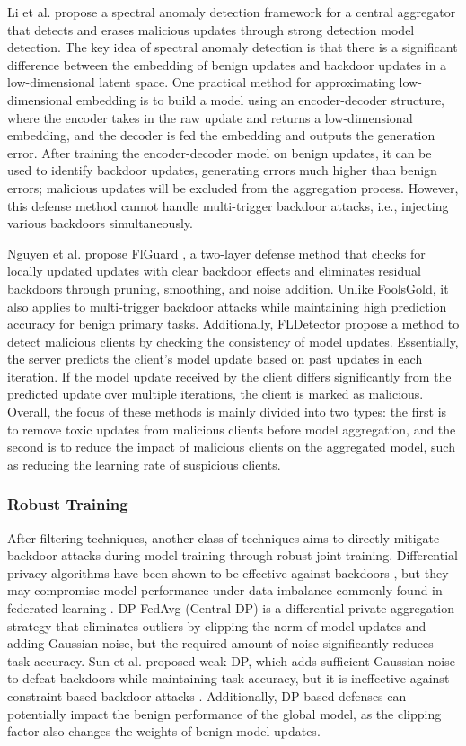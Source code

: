 \documentclass[conference]{IEEEtran}
\begin{document}
Li et al. \cite{b79} propose a spectral anomaly detection framework for a
central aggregator that detects and erases malicious updates through strong detection model detection.
The key idea of spectral anomaly detection is that there is a significant difference between the embedding
of benign updates and backdoor updates in a low-dimensional latent space. One practical method for approximating
low-dimensional embedding is to build a model using an encoder-decoder structure, where the encoder takes
in the raw update and returns a low-dimensional embedding, and the decoder is fed the embedding and outputs
the generation error.  After training the encoder-decoder model on benign updates, it can be used to identify
backdoor updates, generating errors much higher than benign errors; malicious updates will be excluded from
the aggregation process. However, this defense method cannot handle multi-trigger backdoor attacks, i.e.,
injecting various backdoors simultaneously.

Nguyen et al. propose FlGuard \cite{b80}, a two-layer defense method that checks
for locally updated updates with clear backdoor effects and eliminates residual backdoors through pruning, smoothing, and noise
addition. Unlike FoolsGold\cite{b78}, it also applies to multi-trigger backdoor attacks while maintaining high prediction accuracy for benign primary tasks.
Additionally, FLDetector \cite{b81} propose a method to detect malicious clients by checking the consistency of model updates. Essentially,
the server predicts the client's model update based on past updates in each iteration. If the model update received by the client
differs significantly from the predicted update over multiple iterations, the client is marked as malicious. Overall, the focus of
these methods is mainly divided into two types: the first is to remove toxic updates from malicious clients before model aggregation,
and the second is to reduce the impact of malicious clients on the aggregated model, such as reducing the learning rate of suspicious clients.

\subsubsection{Robust Training}
After filtering techniques, another class of techniques aims to directly mitigate backdoor attacks during model training through robust joint training.
Differential privacy algorithms have been shown to be effective against backdoors \cite{b82}, but they may compromise model performance under data imbalance
commonly found in federated learning \cite{b83}. DP-FedAvg \cite{b84} (Central-DP) is a differential private aggregation strategy that eliminates
outliers by clipping the norm of model updates and adding Gaussian noise, but the required amount of noise significantly reduces
task accuracy. Sun et al. \cite{b27} proposed weak DP, which adds sufficient Gaussian noise to defeat backdoors while maintaining task accuracy,
but it is ineffective against constraint-based backdoor attacks \cite{b25}.
Additionally, DP-based defenses can potentially impact the benign performance of the global model,
as the clipping factor also changes the weights of benign model updates.
\end{document}
